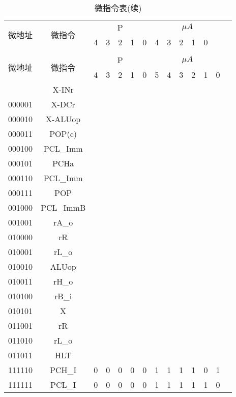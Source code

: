 \documentclass[10pt]{book}
\begin{document}
\begin{landscape}
\begin{longtable}{|c|c|c|c|c|c|c|c|c|c|c|c|c|c|}
\caption{微指令表} \label{tb_micro_prog2} \\
\hline
\multirow{2}{1.5cm}{微地址} & \multirow{2}{1.5cm}{微指令} & \multicolumn{5}{c|}{P} & \multicolumn {6}{c|}{$\mu A$} \\
\cline{3-13}
                          &           & 4 & 3 & 2 & 1 & 0 & 4 & 3 & 2 & 1 & 0 \\
\hline
\endfirsthead
\caption{微指令表(续)} \\
\hline
\multirow{2}{1.5cm}{微地址} & \multirow{2}{1.5cm}{微指令} & \multicolumn{5}{c|}{P} & \multicolumn {6}{c|}{$\mu A$} \\
\cline{3-13}
                          &           & 4 & 3 & 2 & 1 & 0 & 5 & 4 & 3 & 2 & 1 & 0 \\
\hline
\endhead
\hline
\endfoot
000000 & X-INr 		& \\
000001 & X-DCr 		& \\
000010 & X-ALUop 	& \\
000011 & POP(c) 	& \\
000100 & PCL\_Imm 	& \\
000101 & PCHa 		& \\
000110 & PCL\_Imm 	& \\
000111 & POP 		& \\
\hline
001000 & PCL\_ImmB	& \\
001001 & rA\_o		& \\
\hline
010000 & rR		& \\
010001 & rL\_o		& \\
010010 & ALUop		& \\
010011 & rH\_o		& \\
010100 & rB\_i 		& \\
010101 & X 		& \\
\hline
011001 & rR		& \\
011010 & rL\_o		& \\
011011 & HLT		& \\
\hline
111110 & PCH\_I 	& 0 & 0 & 0 & 0 & 0 & 1 & 1 & 1 & 1 & 0 & 1 \\
111111 & PCL\_I 	& 0 & 0 & 0 & 0 & 0 & 1 & 1 & 1 & 1 & 1 & 0 \\
\end{longtable}
\end{landscape}
\end{document}
